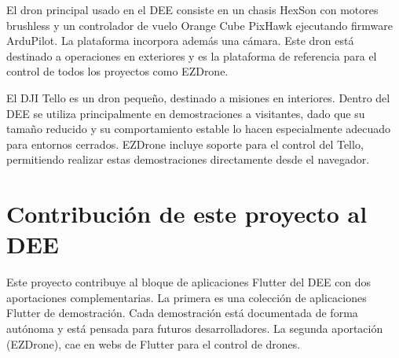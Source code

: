 El dron principal usado en el DEE consiste en un chasis HexSon con motores brushless y un controlador de vuelo Orange Cube PixHawk ejecutando firmware ArduPilot\cite{hexsoon}. La plataforma incorpora además una cámara. Este dron está destinado a operaciones en exteriores y es la plataforma de referencia para el control de todos los proyectos como EZDrone.

El DJI Tello es un dron pequeño, destinado a misiones en interiores. Dentro del DEE se utiliza principalmente en demostraciones a visitantes, dado que su tamaño reducido y su comportamiento estable lo hacen especialmente adecuado para entornos cerrados\cite{telloEETAC}. EZDrone incluye soporte para el control del Tello, permitiendo realizar estas demostraciones directamente desde el navegador.


\section{Contribución de este proyecto al DEE}
Este proyecto contribuye al bloque de aplicaciones Flutter del DEE con dos aportaciones complementarias. La primera es una colección de aplicaciones Flutter de demostración. Cada demostración está documentada de forma autónoma y está pensada para futuros desarrolladores. La segunda aportación (EZDrone), cae en webs de Flutter para el control de drones.

